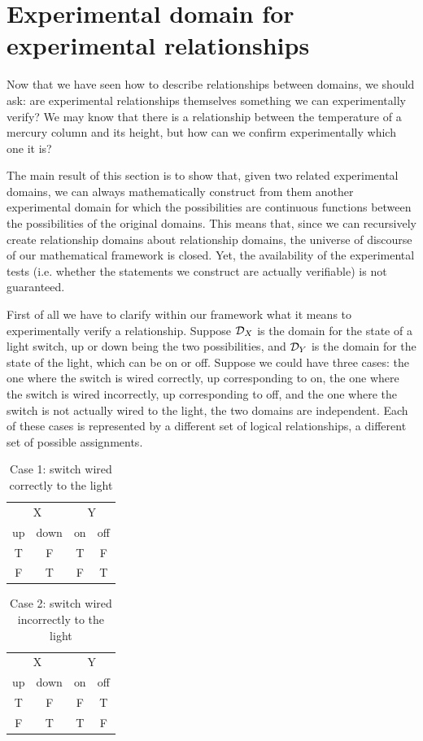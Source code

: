 \documentclass[11pt,letterpaper,fleqn]{memoir} %
\begin{document}
\section{Experimental domain for experimental relationships}

Now that we have seen how to describe relationships between domains, we should ask: are experimental relationships themselves something we can experimentally verify? We may know that there is a relationship between the temperature of a mercury column and its height, but how can we confirm experimentally which one it is?

The main result of this section is to show that, given two related experimental domains, we can always mathematically construct from them another experimental domain for which the possibilities are continuous functions between the possibilities of the original domains. This means that, since we can recursively create relationship domains about relationship domains, the universe of discourse of our mathematical framework is closed. Yet, the availability of the experimental tests (i.e. whether the statements we construct are actually verifiable) is not guaranteed.

First of all we have to clarify within our framework what it means to experimentally verify a relationship. Suppose $\mathcal{D}_X$ is the domain for the state of a light switch, up or down being the two possibilities, and $\mathcal{D}_Y$ is the domain for the state of the light, which can be on or off. Suppose we could have three cases: the one where the switch is wired correctly, up corresponding to on, the one where the switch is wired incorrectly, up corresponding to off, and the one where the switch is not actually wired to the light, the two domains are independent. Each of these cases is represented by a different set of logical relationships, a different set of possible assignments.

\begin{table}[h]
\centering
\begin{tabular}{c|c|c|c}
\multicolumn{2}{c|}{X} & \multicolumn{2}{c}{Y} \\
	up & down & on & off \\
	\hline
	T & F & T & F \\
	F & T & F & T \\
\end{tabular}
\caption{Case 1: switch wired correctly to the light}
\end{table}

\begin{table}[h]
\centering
\begin{tabular}{c|c|c|c}
	\multicolumn{2}{c|}{X} & \multicolumn{2}{c}{Y} \\
	up & down & on & off \\
	\hline
	T & F & F & T \\
	F & T & T & F \\
\end{tabular}
\caption{Case 2: switch wired incorrectly to the light}
\end{table}
\end{document}
